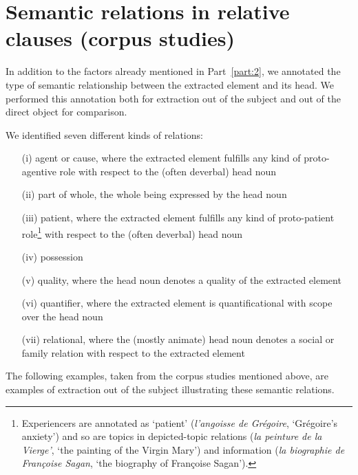 \chapter{Semantic relations in relative clauses (corpus studies)}
In addition to the factors already mentioned in Part~\ref{part:2}, we annotated the type of semantic relationship between the extracted element and its head. We performed this annotation both for extraction out of the subject and out of the direct object for comparison.

We identified seven different kinds of relations: 
\begin{itemize}
    \item[(i)] agent or cause, where the extracted element fulfills any kind of proto-agentive role with respect to the (often deverbal) head noun
    \item[(ii)] part of whole, the whole being expressed by the head noun
    \item[(iii)] patient, where the extracted element fulfills any kind of proto-patient role\footnote{Experiencers are annotated as `patient' (\emph{l'angoisse de Grégoire}, `Grégoire's anxiety') and so are topics in depicted-topic relations (\emph{la peinture de la Vierge'}, `the painting of the Virgin Mary') and information (\emph{la biographie de Françoise Sagan}, `the biography of Françoise Sagan').} with respect to the (often deverbal) head noun
    \item[(iv)] possession
    \item[(v)] quality, where the head noun denotes a quality of the extracted element
    \item[(vi)] quantifier, where the extracted element is quantificational with scope over the head noun
    \item[(vii)] relational, where the (mostly animate) head noun denotes a social or family relation with respect to the extracted element
\end{itemize}
The following examples, taken from the corpus studies mentioned above, are examples of extraction out of the subject illustrating these semantic relations.\largerpage[-1]\pagebreak

